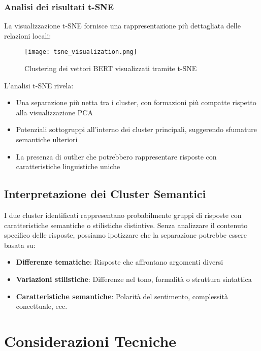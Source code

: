 \documentclass{article}
\begin{document}
\subsubsection{Analisi dei risultati t-SNE}

La visualizzazione t-SNE fornisce una rappresentazione più dettagliata delle relazioni locali:

\begin{figure}[h]
    \centering
    \texttt{[image: tsne\_visualization.png]}
    \caption{Clustering dei vettori BERT visualizzati tramite t-SNE}
    \label{fig:tsne}
\end{figure}

L'analisi t-SNE rivela:

\begin{itemize}
    \item Una separazione più netta tra i cluster, con formazioni più compatte rispetto alla visualizzazione PCA
    \item Potenziali sottogruppi all'interno dei cluster principali, suggerendo sfumature semantiche ulteriori
    \item La presenza di outlier che potrebbero rappresentare risposte con caratteristiche linguistiche uniche
\end{itemize}

\subsection{Interpretazione dei Cluster Semantici}

I due cluster identificati rappresentano probabilmente gruppi di risposte con caratteristiche semantiche o stilistiche distintive. Senza analizzare il contenuto specifico delle risposte, possiamo ipotizzare che la separazione potrebbe essere basata su:

\begin{itemize}
    \item \textbf{Differenze tematiche}: Risposte che affrontano argomenti diversi
    \item \textbf{Variazioni stilistiche}: Differenze nel tono, formalità o struttura sintattica
    \item \textbf{Caratteristiche semantiche}: Polarità del sentimento, complessità concettuale, ecc.
\end{itemize}

\section{Considerazioni Tecniche}
\end{document}
